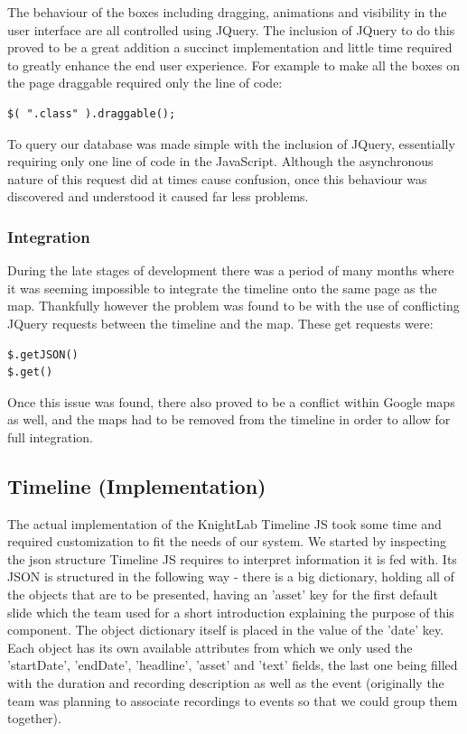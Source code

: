 \documentclass{l3proj}
\begin{document}
The behaviour of the boxes including dragging, animations and visibility in the user interface are all controlled using JQuery. The inclusion of JQuery to do this proved to be a great addition a succinct implementation and little time required to greatly enhance the end user experience. For example to make all the boxes on the page draggable required only the line of code:
\begin{verbatim}
$( ".class" ).draggable();
\end{verbatim}
To query our database was made simple with the inclusion of JQuery, essentially requiring only one line of code in the JavaScript. Although the asynchronous nature of this request did at times cause confusion, once this behaviour was discovered and understood it caused far less problems.

\subsubsection{Integration}

During the late stages of development there was a period of many months where it was seeming impossible to integrate the timeline onto the same page as the map. Thankfully however the problem was found to be with the use of conflicting JQuery requests between the timeline and the map. These get requests were:
\begin{verbatim}
$.getJSON()
$.get()
\end{verbatim}
Once this issue was found, there also proved to be a conflict within Google maps as well, and the maps had to be removed from the timeline in order to allow for full integration.

\subsection{Timeline (Implementation)}

The actual implementation of the KnightLab Timeline JS took some time and required customization to fit the needs of our system. We started by inspecting the json structure Timeline JS requires to interpret information it is fed with.
Its JSON is structured in the following way - there is a big dictionary, holding all of the objects that are to be presented, having an 'asset' key for the first default slide which the team used for a short introduction explaining the purpose of this component.
The object dictionary itself is placed in the value of the 'date' key. Each object has its own available attributes from which we only used the 'startDate', 'endDate', 'headline', 'asset' and 'text' fields, the last one being filled with the duration and recording description as well as the event (originally the team was planning to associate recordings to events so that we could group them together).
\end{document}
